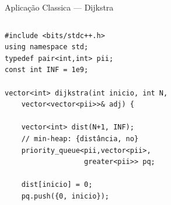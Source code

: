 \documentclass[aspectratio=169,10pt]{beamer}
\begin{document}
\begin{frame}[fragile,shrink=5]{Aplicação Classica --- Dijkstra}
  \begin{columns}[t]
      \begin{tcolorbox}[caixaCodigo]
        \begin{lstlisting}[style=cppsmall]
#include <bits/stdc++.h>
using namespace std;
typedef pair<int,int> pii;
const int INF = 1e9;

vector<int> dijkstra(int inicio, int N,
    vector<vector<pii>>& adj) {

    vector<int> dist(N+1, INF);
    // min-heap: {distância, no}
    priority_queue<pii,vector<pii>,
                   greater<pii>> pq;

    dist[inicio] = 0;
    pq.push({0, inicio});


\end{lstlisting}
\end{tcolorbox}
\end{columns}
\end{frame}
\end{document}
